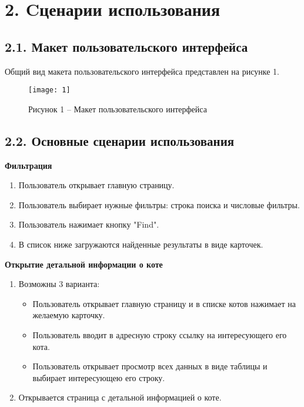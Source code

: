 \pagebreak
{}
\section*{2. Cценарии использования}

\subsection*{2.1. Макет пользовательского интерфейса}
Общий вид макета пользовательского интерфейса представлен на рисунке 1.
\begin{figure}[H]
    \centering
    \texttt{[image: 1]}
    \caption*{Рисунок 1 -- Макет пользовательского интерфейса}
    \label{fig:1}
\end{figure}

\subsection*{2.2. Основные сценарии использования}
\textbf{Фильтрация}
\begin{enumerate}
    \item Пользователь открывает главную страницу.
    \item Пользователь выбирает нужные фильтры: строка поиска и числовые фильтры.
    \item Пользователь нажимает кнопку "Find".
    \item В список ниже загружаются найденные результаты в виде карточек.
\end{enumerate}

\textbf{Открытие детальной информации о коте}
\begin{enumerate}
    \item Возможны 3 варианта:
    \begin{itemize}
        \item Пользователь открывает главную страницу и в списке котов нажимает на желаемую карточку.
        \item Пользователь вводит в адресную строку ссылку на интересующего его кота.
        \item Пользователь открывает просмотр всех данных в виде таблицы и выбирает интересующею его строку.
    \end{itemize}
    \item Открывается страница с детальной информацией о коте.
\end{enumerate}

